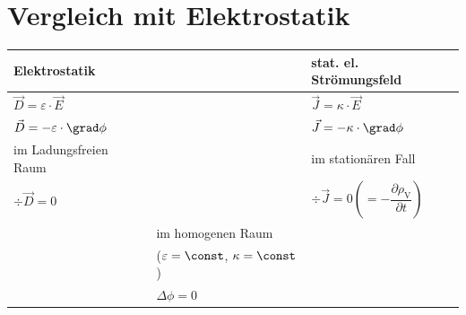  \section{Vergleich mit Elektrostatik}
  \begin{tabular}{>{\centering}p{}>{\centering}p{}>{\centering\arraybackslash}p{}}
	  Elektrostatik                                                                    &                                                   & stat. el. Strömungsfeld                                                            \\
	  \hline
	  \(\vec{D}  = \varepsilon \cdot \vec{E} \)                                        & \quad                                             & \(\vec{J} = \kappa \cdot \vec{E} \)                                                \\
	  \(\vec{D}  = -\varepsilon \cdot \grad \phi \)                                    &                                                   & \(\vec{J} = -\kappa \cdot \grad \phi \)                                            \\
	  im Ladungsfreien Raum                                                            &                                                   & im stationären Fall                                                                \\
	  \(\div \vec{D}  = 0 \)                                                           &                                                   & \(\div \vec{J} = 0 \left( = -\dfrac{\partial \rho_\text{V}}{\partial t} \right) \) \\
	                                                                                   & im homogenen Raum                                    &                                                                                    \\
	                                                                                   & (\(\varepsilon = \const \), \(\kappa = \const \)) &                                                                                    \\
	                                                                                   & \(\Delta \phi = 0 \)                              &                                                                                    \\

\end{tabular}
